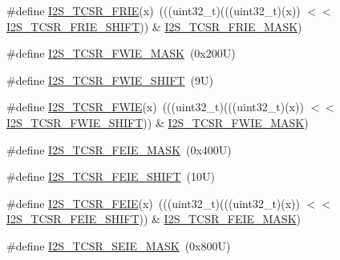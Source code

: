\begin{DoxyCompactItemize}
\item 
\#define \mbox{\hyperlink{group___i2_s___register___masks_ga46fc6ae4e8416b444cde4a23da832d42}{I2\+S\+\_\+\+T\+C\+S\+R\+\_\+\+F\+R\+IE}}(x)~(((uint32\+\_\+t)(((uint32\+\_\+t)(x)) $<$$<$ \mbox{\hyperlink{group___i2_s___register___masks_gae80718274a142dbe1c9b84baddb880fe}{I2\+S\+\_\+\+T\+C\+S\+R\+\_\+\+F\+R\+I\+E\+\_\+\+S\+H\+I\+FT}})) \& \mbox{\hyperlink{group___i2_s___register___masks_gaa4df5fe488cb4d2acb0bfd546f660507}{I2\+S\+\_\+\+T\+C\+S\+R\+\_\+\+F\+R\+I\+E\+\_\+\+M\+A\+SK}})
\item 
\#define \mbox{\hyperlink{group___i2_s___register___masks_ga4cd03b204167fc3671c12fa3462d38fb}{I2\+S\+\_\+\+T\+C\+S\+R\+\_\+\+F\+W\+I\+E\+\_\+\+M\+A\+SK}}~(0x200\+U)
\item 
\#define \mbox{\hyperlink{group___i2_s___register___masks_ga666587a04effa8fc8ff5411eacbee7db}{I2\+S\+\_\+\+T\+C\+S\+R\+\_\+\+F\+W\+I\+E\+\_\+\+S\+H\+I\+FT}}~(9\+U)
\item 
\#define \mbox{\hyperlink{group___i2_s___register___masks_gaf88e6e28efd9bc5ef3d3a1e490fa2bc4}{I2\+S\+\_\+\+T\+C\+S\+R\+\_\+\+F\+W\+IE}}(x)~(((uint32\+\_\+t)(((uint32\+\_\+t)(x)) $<$$<$ \mbox{\hyperlink{group___i2_s___register___masks_ga666587a04effa8fc8ff5411eacbee7db}{I2\+S\+\_\+\+T\+C\+S\+R\+\_\+\+F\+W\+I\+E\+\_\+\+S\+H\+I\+FT}})) \& \mbox{\hyperlink{group___i2_s___register___masks_ga4cd03b204167fc3671c12fa3462d38fb}{I2\+S\+\_\+\+T\+C\+S\+R\+\_\+\+F\+W\+I\+E\+\_\+\+M\+A\+SK}})
\item 
\#define \mbox{\hyperlink{group___i2_s___register___masks_ga396da367b36ad3ece4724ee59140968f}{I2\+S\+\_\+\+T\+C\+S\+R\+\_\+\+F\+E\+I\+E\+\_\+\+M\+A\+SK}}~(0x400\+U)
\item 
\#define \mbox{\hyperlink{group___i2_s___register___masks_ga6115a14264154cbd0f1b604dbe873a14}{I2\+S\+\_\+\+T\+C\+S\+R\+\_\+\+F\+E\+I\+E\+\_\+\+S\+H\+I\+FT}}~(10\+U)
\item 
\#define \mbox{\hyperlink{group___i2_s___register___masks_gae37d201d00631fc28269558ab97a0c6b}{I2\+S\+\_\+\+T\+C\+S\+R\+\_\+\+F\+E\+IE}}(x)~(((uint32\+\_\+t)(((uint32\+\_\+t)(x)) $<$$<$ \mbox{\hyperlink{group___i2_s___register___masks_ga6115a14264154cbd0f1b604dbe873a14}{I2\+S\+\_\+\+T\+C\+S\+R\+\_\+\+F\+E\+I\+E\+\_\+\+S\+H\+I\+FT}})) \& \mbox{\hyperlink{group___i2_s___register___masks_ga396da367b36ad3ece4724ee59140968f}{I2\+S\+\_\+\+T\+C\+S\+R\+\_\+\+F\+E\+I\+E\+\_\+\+M\+A\+SK}})
\item 
\#define \mbox{\hyperlink{group___i2_s___register___masks_gaf9e74dea26989013c641104d00be6e21}{I2\+S\+\_\+\+T\+C\+S\+R\+\_\+\+S\+E\+I\+E\+\_\+\+M\+A\+SK}}~(0x800\+U)
$$
\end{DoxyCompactItemize}
